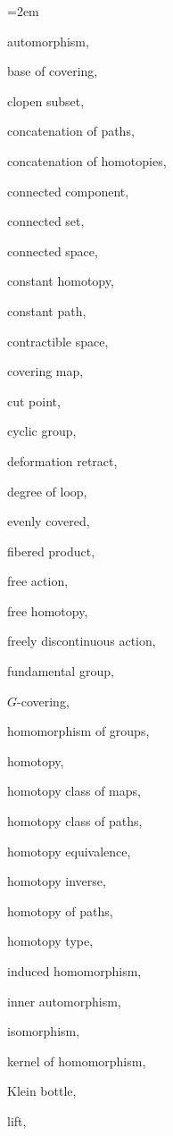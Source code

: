 {%
\scriptsize
\begin{list}{}{\leftmargin=2em}
  \item automorphism,
  \item base of covering,
  \item clopen subset,
  \item concatenation of paths,
  \item concatenation of homotopies,
  \item connected component,
  \item connected set,
  \item connected space,
  \item constant homotopy,
  \item constant path,
  \item contractible space,
  \item covering map,
  \item cut point,
  \item cyclic group,
  \item deformation retract,
  \item degree of loop,
  \item evenly covered,
  \item fibered product,
  \item free action,
  \item free homotopy,
  \item freely discontinuous action,
  \item fundamental group,
  \item $G$-covering,
  \item homomorphism of groups,
  \item homotopy,
  \item homotopy class of maps,
  \item homotopy class of paths,
  \item homotopy equivalence,
  \item homotopy inverse,
  \item homotopy of paths,
  \item homotopy type,
  \item induced homomorphism,
  \item inner automorphism,
  \item isomorphism,
  \item kernel of homomorphism,
  \item Klein bottle,
  \item lift,

\end{list}}
